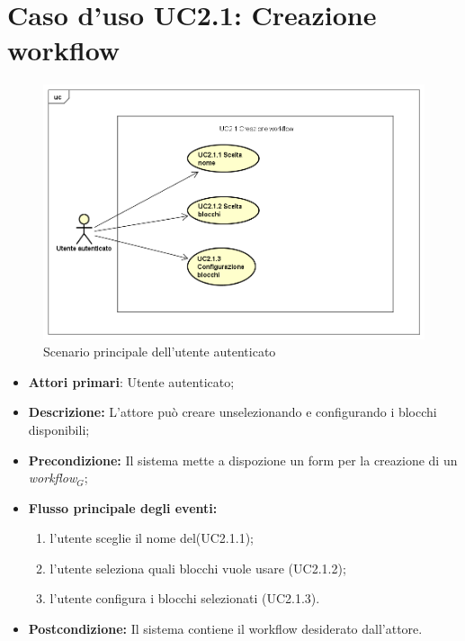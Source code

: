 		\section{Caso d'uso UC2.1: Creazione workflow}
		\begin{figure} [h]
			\centering
			\includegraphics[scale=0.4]{./Diagram/UC2-1.png}
			\caption{Scenario principale dell'utente autenticato }\label{}
		\end{figure}
		\begin{itemize}
			\item \textbf{Attori primari}: Utente autenticato;
			\item \textbf{Descrizione:} L'attore può creare unselezionando e configurando i blocchi disponibili;
			\item \textbf{Precondizione:} Il sistema mette a dispozione un form per la creazione di un \textit{workflow$_{G}$};
			\item \textbf{Flusso principale degli eventi:}
			\begin{enumerate}
				\item l'utente sceglie il nome del(UC2.1.1);
				\item l'utente seleziona quali blocchi vuole usare (UC2.1.2);
				\item l'utente configura i blocchi selezionati (UC2.1.3).
			\end{enumerate}
			\item \textbf{Postcondizione:} Il sistema contiene il workflow desiderato dall'attore.
		\end{itemize}
